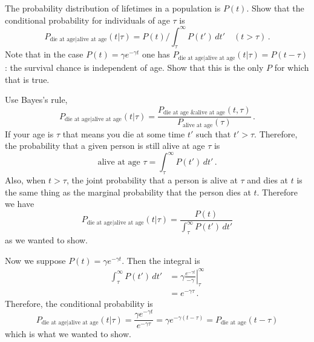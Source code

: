 

The probability distribution of lifetimes in a population is $P(t)$.
Show that the conditional probability for individuals of age $\tau$ is
\begin{equation*}
  P_{\text{die at age}|\text{alive at age}}(t | \tau) = P(t) / \int_\tau^\infty P(t') \, dt' \quad (t > \tau)
  \, .
\end{equation*}
Note that in the case $P(t) = \gamma e^{-\gamma t}$ one has $P_{\text{die at age}|\text{alive at age}}(t|\tau) = P(t - \tau)$: the survival chance is independent of age.
Show that this is the only $P$ for which that is true.


Use Bayes's rule,
\begin{equation*}
  P_{\text{die at age}|\text{alive at age}}(t | \tau)
  = \frac{P_{\text{die at age \& alive at age}}(t, \tau)}{P_{\text{alive at age}}(\tau)}
  \, .
\end{equation*}
If your age is $\tau$ that means you die at some time $t'$ such that $t' > \tau$.
Therefore, the probability that a given person is still alive at age $\tau$ is
\begin{equation*}
  \text{alive at age }\tau = \int_\tau^\infty P(t') \, dt'
  \, .
\end{equation*}
Also, when $t > \tau$, the joint probability that a person is alive at $\tau$ and dies at $t$ is the same thing as the marginal probability that the person dies at $t$.
Therefore we have
\begin{equation*}
  P_{\text{die at age}|\text{alive at age}}(t | \tau)
  = \frac{P(t)}{\int_\tau^\infty P(t') \, dt'}
\end{equation*}
as we wanted to show.

Now we suppose $P(t) = \gamma e^{-\gamma t}$.
Then the integral is
\begin{align*}
  \int_\tau^\infty P(t') \, dt'
  &= \gamma \left. \frac{e^{-\gamma t}}{-\gamma} \right|_\tau^\infty \\
  &= e^{-\gamma \tau}
  \, .
\end{align*}
Therefore, the conditional probability is
\begin{equation*}
  P_{\text{die at age}|\text{alive at age}}(t | \tau)
  = \frac{\gamma e^{-\gamma t}}{e^{-\gamma \tau}} = \gamma e^{-\gamma (t - \tau)}
  = P_\text{die at age} ( t - \tau)
\end{equation*}
which is what we wanted to show.

